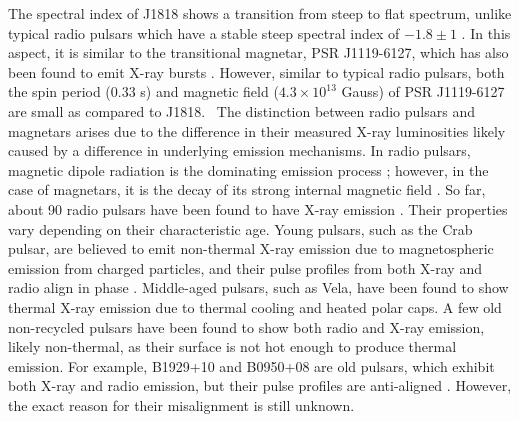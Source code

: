 \documentclass[twocolumn]{emulateapj}
\begin{document}
The spectral index of J1818 shows a transition from steep to flat spectrum, unlike typical radio pulsars which have a stable steep spectral index of $-1.8 \pm 1$ \citep{maron2000}. In this aspect, it is similar to the transitional magnetar, PSR J1119-6127, which has also been found to emit X-ray bursts \citep{Gogus__2016}. However, similar to typical radio pulsars, both the spin period (0.33 s) and magnetic field ($4.3 \times 10^{13}$ Gauss) of PSR J1119-6127 are small as compared to J1818. 
The distinction between radio pulsars and magnetars arises due to the difference in their measured X-ray luminosities likely caused by a difference in underlying emission mechanisms. In radio pulsars, magnetic dipole radiation is the dominating emission process \citep{kramer09}; however, in the case of magnetars, it is the decay of its strong internal magnetic field \citep{kaspi2017}. So far, about 90 radio pulsars have been found to have X-ray emission \citep{becker2009}. Their properties vary depending on their characteristic age. Young pulsars, such as the Crab pulsar, are believed to emit non-thermal X-ray emission due to magnetospheric emission from charged particles, and their pulse profiles from both X-ray and radio align in phase \citep{becker2009}. Middle-aged pulsars, such as Vela, have been found to show thermal X-ray emission due to thermal cooling and heated polar caps. A few old non-recycled pulsars have been found to show both radio and X-ray emission, likely non-thermal, as their surface is not hot enough to produce thermal emission. For example, B1929+10 and B0950+08 are old pulsars, which exhibit both X-ray and radio emission, but their pulse profiles are anti-aligned \citep{Becker_2006}. However, the exact reason for their misalignment is still unknown. %
\end{document}
